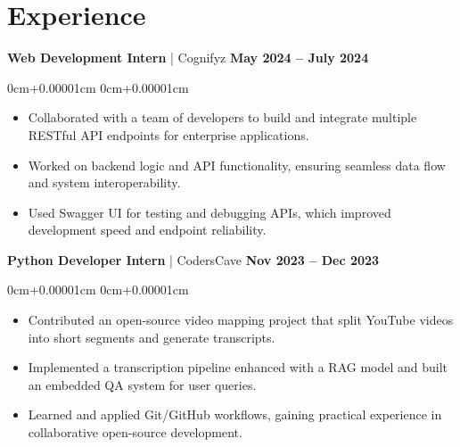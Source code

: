 \documentclass[10pt,a4paper]{article}
\newenvironment{highlights}{
    \begin{itemize}[
        topsep=0.10cm,
        parsep=0.10cm,
        partopsep=0pt,
        itemsep=0pt,
        leftmargin=10pt,
    ]
    }{
    \end{itemize}
}
\newenvironment{onecolentry}{
    \begin{adjustwidth}{
        0cm+0.00001cm
    }{
        0cm+0.00001cm
    }
    }{
    \end{adjustwidth}
}
\begin{document}
    \section{Experience}\label{sec:experience}

    \textbf{Web Development Intern} | Cognifyz \hfill \textbf{May 2024 – July 2024}
    \begin{onecolentry}
        \begin{highlights}
            \vspace{0.01cm}
            \item Collaborated with a team of developers to build and integrate multiple RESTful API endpoints for enterprise applications.
            \item Worked on backend logic and API functionality, ensuring seamless data flow and system interoperability.
            \item Used Swagger UI for testing and debugging APIs, which improved development speed and endpoint reliability.
        \end{highlights}
    \end{onecolentry}
    \vspace{0.1cm}
    \textbf{Python Developer Intern} | CodersCave \hfill \textbf{Nov 2023 – Dec 2023}
    \begin{onecolentry}
        \begin{highlights}
            \vspace{0.01cm}
            \item Contributed an open-source video mapping project that split YouTube videos into short segments and generate transcripts.
            \item Implemented a transcription pipeline enhanced with a RAG model and built an embedded QA system for user queries.
            \item Learned and applied Git/GitHub workflows, gaining practical experience in collaborative open-source development.
        \end{highlights}
    \end{onecolentry}
\end{document}
